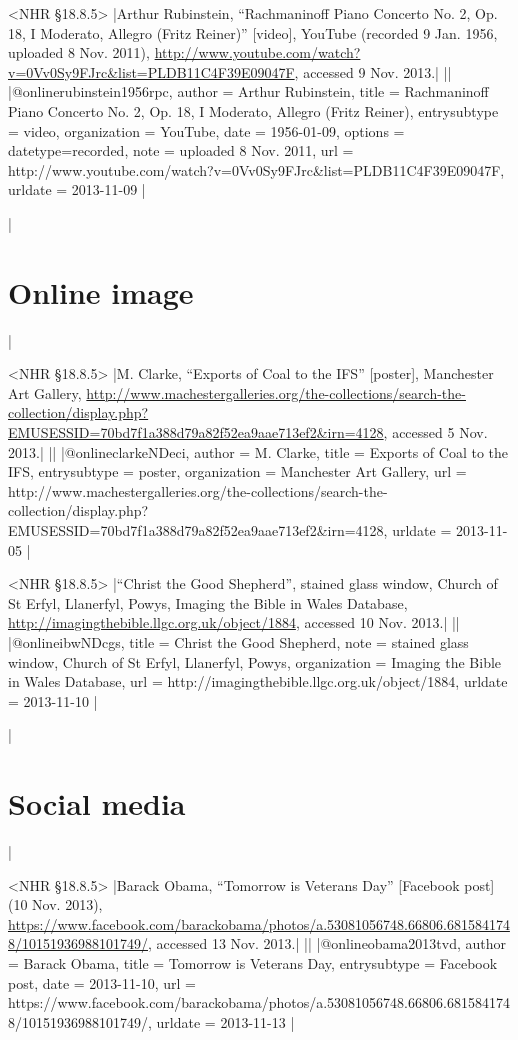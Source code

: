 \documentclass[extrafontsizes,11pt,a4paper,oneside]{memoir}
\begin{document}
\bibexample<NHR \S18.8.5>
|Arthur Rubinstein, \enquote{Rachmaninoff Piano Concerto No. 2, Op. 18, I Moderato, Allegro (Fritz Reiner)} [video], YouTube (recorded 9 Jan. 1956, uploaded 8 Nov. 2011), \url{http://www.youtube.com/watch?v=0Vv0Sy9FJrc&list=PLDB11C4F39E09047F}, accessed 9 Nov. 2013.|%
||%
|@online{rubinstein1956rpc,
  author = {Arthur Rubinstein},
  title = {Rachmaninoff Piano Concerto No. 2, Op. 18, I Moderato, Allegro (Fritz Reiner)},
  entrysubtype = {video},
  organization = {YouTube},
  date = {1956-01-09},
  options = {datetype={recorded}},
  note = {uploaded 8 Nov. 2011},
  url = {http://www.youtube.com/watch?v=0Vv0Sy9FJrc&list=PLDB11C4F39E09047F},
  urldate = {2013-11-09}
}|

\todoc|
\section{Online image}
|

\bibexample<NHR \S18.8.5>
|M. Clarke, \enquote{Exports of Coal to the IFS} [poster], Manchester Art Gallery, \url{http://www.machestergalleries.org/the-collections/search-the-collection/display.php?EMUSESSID=70bd7f1a388d79a82f52ea9aae713ef2&irn=4128}, accessed 5 Nov. 2013.|%
||%
|@online{clarkeNDeci,
  author = {M. Clarke},
  title = {Exports of Coal to the IFS},
  entrysubtype = {poster},
  organization = {Manchester Art Gallery},
  url = {http://www.machestergalleries.org/the-collections/search-the-collection/display.php?EMUSESSID=70bd7f1a388d79a82f52ea9aae713ef2&irn=4128},
  urldate = {2013-11-05}
}|

\bibexample<NHR \S18.8.5>
|\enquote{Christ the Good Shepherd}, stained glass window, Church of St Erfyl, Llanerfyl, Powys, Imaging the Bible in Wales Database, \url{http://imagingthebible.llgc.org.uk/object/1884}, accessed 10 Nov. 2013.|%
||%
|@online{ibwNDcgs,
  title = {Christ the Good Shepherd},
  note = {stained glass window, Church of St Erfyl, Llanerfyl, Powys},
  organization = {Imaging the Bible in Wales Database},
  url = {http://imagingthebible.llgc.org.uk/object/1884},
  urldate = {2013-11-10}
}|

\todoc|
\section{Social media}
|

\bibexample<NHR \S18.8.5>
|Barack Obama, \enquote{Tomorrow is Veterans Day} [Facebook post] (10 Nov. 2013), \url{https://www.facebook.com/barackobama/photos/a.53081056748.66806.6815841748/10151936988101749/}, accessed 13 Nov. 2013.|
||%
|@online{obama2013tvd,
  author = {Barack Obama},
  title = {Tomorrow is Veterans Day},
  entrysubtype = {Facebook post},
  date = {2013-11-10},
  url = {https://www.facebook.com/barackobama/photos/a.53081056748.66806.6815841748/10151936988101749/},
  urldate = {2013-11-13}
}|
\end{document}
